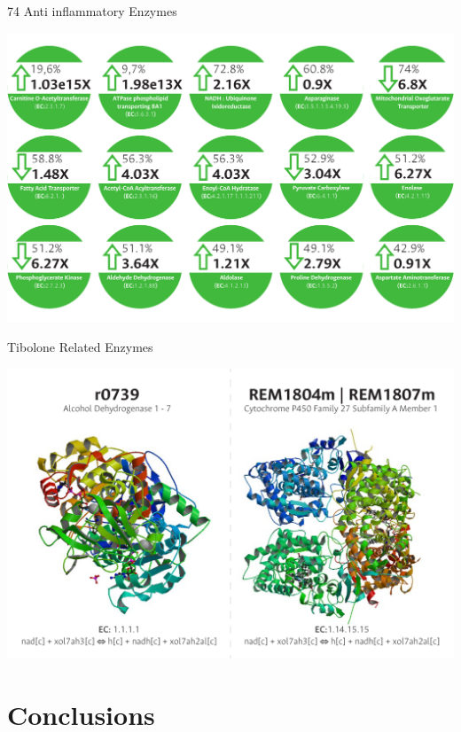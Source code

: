 \documentclass[11pt]{beamer}
\begin{document}
\begin{frame}{74 Anti inflammatory Enzymes}
\begin{center}
\includegraphics[width=\textwidth]{Antiinflammatory}
\end{center}
\end{frame}
\begin{frame}{Tibolone Related Enzymes}
\begin{center}
\includegraphics[width=\textwidth]{TiboloneEnzymes}
\end{center}
\end{frame}
\section{Conclusions}
\begin{frame}
\begin{center}

\end{center}
\end{frame}
\end{document}
